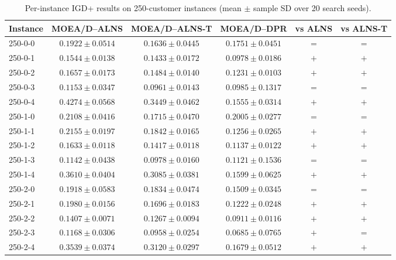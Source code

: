 \begin{table}[t]
\centering
\caption{Per-instance IGD+ results on 250-customer instances (mean $\pm$ sample SD over 20 search seeds).}
\begin{tabular}{lccccc}
\toprule
Instance & MOEA/D--ALNS & MOEA/D--ALNS-T & MOEA/D--DPR & vs ALNS & vs ALNS-T \\
\midrule
250-0-0 & $0.1922 \pm 0.0514$ & $\mathbf{0.1636 \pm 0.0445}$ & $0.1751 \pm 0.0451$ & $=$ & $=$ \\
250-0-1 & $0.1544 \pm 0.0138$ & $0.1433 \pm 0.0172$ & $\mathbf{0.0978 \pm 0.0186}$ & $+$ & $+$ \\
250-0-2 & $0.1657 \pm 0.0173$ & $0.1484 \pm 0.0140$ & $\mathbf{0.1231 \pm 0.0103}$ & $+$ & $+$ \\
250-0-3 & $0.1153 \pm 0.0347$ & $\mathbf{0.0961 \pm 0.0143}$ & $0.0985 \pm 0.1317$ & $=$ & $=$ \\
250-0-4 & $0.4274 \pm 0.0568$ & $0.3449 \pm 0.0462$ & $\mathbf{0.1555 \pm 0.0314}$ & $+$ & $+$ \\
250-1-0 & $0.2108 \pm 0.0416$ & $\mathbf{0.1715 \pm 0.0470}$ & $0.2005 \pm 0.0277$ & $=$ & $=$ \\
250-1-1 & $0.2155 \pm 0.0197$ & $0.1842 \pm 0.0165$ & $\mathbf{0.1256 \pm 0.0265}$ & $+$ & $+$ \\
250-1-2 & $0.1633 \pm 0.0118$ & $0.1417 \pm 0.0118$ & $\mathbf{0.1137 \pm 0.0122}$ & $+$ & $+$ \\
250-1-3 & $0.1142 \pm 0.0438$ & $\mathbf{0.0978 \pm 0.0160}$ & $0.1121 \pm 0.1536$ & $=$ & $=$ \\
250-1-4 & $0.3610 \pm 0.0404$ & $0.3085 \pm 0.0381$ & $\mathbf{0.1599 \pm 0.0625}$ & $+$ & $+$ \\
250-2-0 & $0.1918 \pm 0.0583$ & $0.1834 \pm 0.0474$ & $\mathbf{0.1509 \pm 0.0345}$ & $=$ & $=$ \\
250-2-1 & $0.1980 \pm 0.0156$ & $0.1696 \pm 0.0183$ & $\mathbf{0.1222 \pm 0.0248}$ & $+$ & $+$ \\
250-2-2 & $0.1407 \pm 0.0071$ & $0.1267 \pm 0.0094$ & $\mathbf{0.0911 \pm 0.0116}$ & $+$ & $+$ \\
250-2-3 & $0.1168 \pm 0.0306$ & $0.0958 \pm 0.0254$ & $\mathbf{0.0685 \pm 0.0765}$ & $+$ & $=$ \\
250-2-4 & $0.3539 \pm 0.0374$ & $0.3120 \pm 0.0297$ & $\mathbf{0.1679 \pm 0.0512}$ & $+$ & $+$ \\
\bottomrule
\end{tabular}
\end{table}

